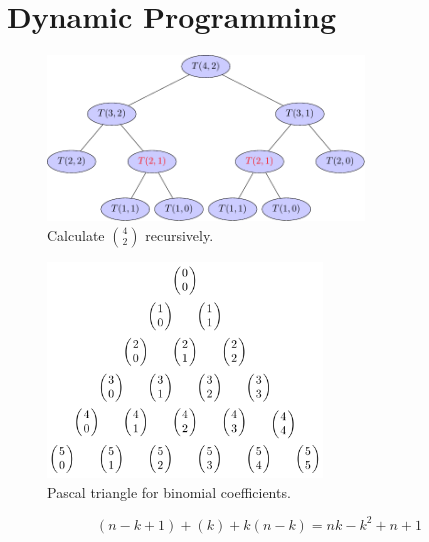 
\chapter{Dynamic Programming}	\label{chapter:dp}



\begin{figure}[h]
  \includegraphics[width = 0.75\textwidth]{figs/binom-4-2}
  \caption{Calculate $\binom{4}{2}$ recursively.}
  \label{fig:binom-recursive}
\end{figure}

\begin{figure}[h]
  \includegraphics[width = 0.65\textwidth]{figs/pascal}
  \caption{Pascal triangle for binomial coefficients.}
  \label{fig:pascal}
\end{figure}



\[
  (n-k+1) + (k) + k (n-k) = nk - k^2 + n + 1
\]

